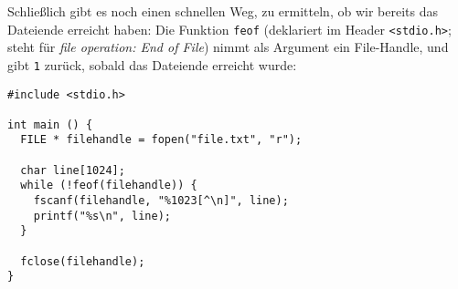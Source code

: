 Schließlich gibt es noch einen schnellen Weg, zu ermitteln, ob wir bereits das Dateiende erreicht haben: Die Funktion \texttt{feof} (deklariert im Header \texttt{<stdio.h>}; steht für \emph{file operation: End of File}) nimmt als Argument ein File-Handle, und gibt \texttt{1} zurück, sobald das Dateiende erreicht wurde:

\begin{codebox}
\begin{verbatim}
#include <stdio.h>

int main () {
  FILE * filehandle = fopen("file.txt", "r");
  
  char line[1024];
  while (!feof(filehandle)) {
    fscanf(filehandle, "%1023[^\n]", line);
    printf("%s\n", line);
  }
  
  fclose(filehandle);
}
\end{verbatim}
\end{codebox}